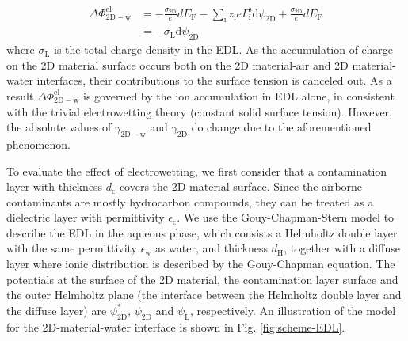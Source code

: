 \documentclass[journal=ancac3,manuscript=article,email=true]{achemso}
\begin{document}
\begin{equation}
\label{eqn:Delta-Phi-final}
\begin{aligned}
\Delta \Phi_{\mathrm{2D-w}}^{\mathrm{el}} &= -\frac{\sigma_{\mathrm{2D}}}{e}dE_{\mathrm{F}} 
                                             -\sum_{\mathrm{i}} z_{\mathrm{i}}e\Gamma_{\mathrm{i}}^{\mathrm{s}} \mathrm{d}\psi_{\mathrm{2D}}
                                             +\frac{\sigma_{\mathrm{2D}}}{e}dE_{\mathrm{F}} \\
                                          &= -\sigma_{\mathrm{L}} \mathrm{d}\psi_{\mathrm{2D}}
\end{aligned}
\end{equation}
where \(\sigma_{\mathrm{L}}\) is the total charge density in the EDL. As
the accumulation of charge on the 2D material surface occurs both on
the 2D material-air and 2D material-water interfaces, their
contributions to the surface tension is canceled out. As a result
\(\Delta \Phi_{\mathrm{2D-w}}^{\mathrm{el}}\) is governed by the ion
accumulation in EDL alone, in consistent with the trivial
electrowetting theory (constant solid surface tension). However, the
absolute values of \(\gamma_{\mathrm{2D-w}}\) and \(\gamma_{\mathrm{2D}}\)
do change due to the aforementioned phenomenon.

To evaluate the effect of electrowetting, we first
consider that a contamination layer with thickness \(d_{\mathrm{c}}\)
covers the 2D material surface. Since the airborne contaminants are
mostly hydrocarbon compounds, they can be treated as a dielectric
layer with permittivity \(\epsilon_{\mathrm{c}}\). We use the
Gouy-Chapman-Stern model to describe the EDL in the aqueous phase,
which consists a Helmholtz double layer with the same permittivity
\(\epsilon_{\mathrm{w}}\) as water, and thickness \(d_{\mathrm{H}}\),
together with a diffuse layer where ionic distribution is described by
the Gouy-Chapman equation.  The potentials at the surface of the 2D
material, the contamination layer surface and the outer Helmholtz
plane (the interface between the Helmholtz double layer and the
diffuse layer) are \(\psi_{\mathrm{2D}}^{*}\), \(\psi_{\mathrm{2D}}\) and
\(\psi_{\mathrm{L}}\), respectively. An illustration of the model for the
2D-material-water interface is shown in Fig. \ref{fig:scheme-EDL}.
\end{document}
